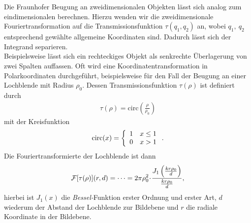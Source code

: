 Die Fraunhofer Beugung an zweidimensionalen Objekten lässt sich analog zum eindimensionalen berechnen. Hierzu wenden wir die zweidimensionale Fouriertransformation auf die Transmissionsfunktion $\tau(q_1,q_2)$ an, wobei $q_1,~q_2$ entsprechend gewählte allgemeine Koordinaten sind. Dadurch lässt sich der Integrand separieren.\\
Beispielsweise lässt sich ein rechteckiges Objekt als senkrechte Überlagerung von zwei Spalten auffassen. Oft wird eine Koordinatentransformation in Polarkoordinaten durchgeführt, beispielsweise für den Fall der Beugung an einer Lochblende mit Radius $\rho_0$. Dessen Transmissionsfunktion $\tau(\rho)$ ist definiert durch
\begin{align}
\tau(\rho)=\mathrm{circ}\left(\frac{\rho}{\rho_0}\right)
\end{align}
mit der Kreisfunktion
\begin{align}
\mathrm{circ}(x)=\left\{
	\begin{array}{l l}
	1 \quad x\le 1\\
	0 \quad x > 1
	\end{array}
	\right. .
\end{align}
Die Fouriertransformierte der Lochblende ist dann
\begin{align}
\mathcal{F}[\tau(\rho)](r,d)=\dots =2\pi\rho_0^2\!\cdot\!\frac{J_1\left(\frac{kr\rho_0}{d}\right)}{\frac{kr\rho_0}{d}},
\end{align}
hierbei ist $J_1(x)$ die \emph{Bessel-}Funktion erster Ordnung und erster Art, $d$ wiederum der Abstand der Lochblende zur Bildebene und $r$ die radiale Koordinate in der Bildebene.


